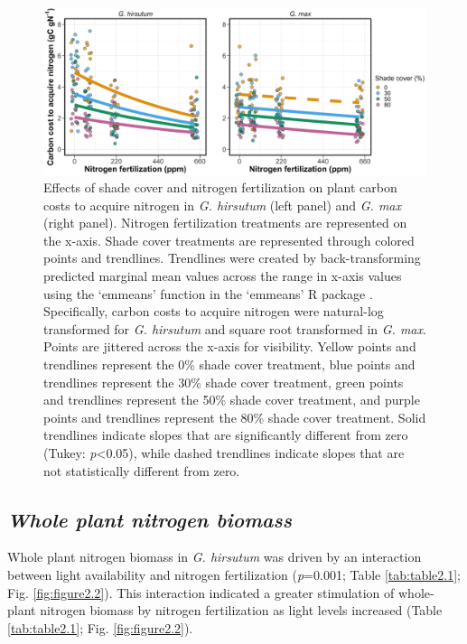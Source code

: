 \newpage
\begin{landscape}
\begin{figure}
    \includegraphics[width=\columnwidth]{ch2_LxN_Greenhouse/figs/fig1_ncost.jpg}
    \centering
    \caption[Effects of shade cover and nitrogen fertilization on plant carbon costs to acquire nitrogen in \textit{G. hirsutum} and \textit{G. max}]{Effects of shade cover and nitrogen fertilization on plant carbon costs to acquire nitrogen in \textit{G. hirsutum} (left panel) and \textit{G. max} (right panel). Nitrogen fertilization treatments are represented on the x-axis. Shade cover treatments are represented through colored points and trendlines. Trendlines were created by back-transforming predicted marginal mean values across the range in x-axis values using the `emmeans’ function in the `emmeans’ R package . Specifically, carbon costs to acquire nitrogen were natural-log transformed for \textit{G. hirsutum} and square root transformed in \textit{G. max}. Points are jittered across the x-axis for visibility. Yellow points and trendlines represent the 0\% shade cover treatment, blue points and trendlines represent the 30\% shade cover treatment, green points and trendlines represent the 50\% shade cover treatment, and purple points and trendlines represent the 80\% shade cover treatment. Solid trendlines indicate slopes that are significantly different from zero (Tukey: \textit{p}<0.05), while dashed trendlines indicate slopes that are not statistically different from zero.}
    \label{fig:figure2.1}
\end{figure}
\end{landscape}
\clearpage

\newpage
\subsection{\textit{Whole plant nitrogen biomass}}
\noindent Whole plant nitrogen biomass in \textit{G. hirsutum} was driven by an interaction between light availability and nitrogen fertilization (\textit{p}=0.001; Table \ref{tab:table2.1}; Fig. \ref{fig:figure2.2}). This interaction indicated a greater stimulation of whole-plant nitrogen biomass by nitrogen fertilization as light levels increased (Table \ref{tab:table2.1}; Fig. \ref{fig:figure2.2}).

